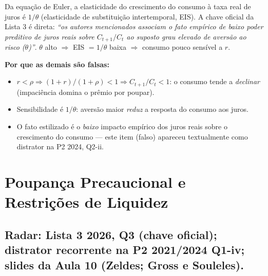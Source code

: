 \documentclass[12pt, a4paper]{article}
\begin{document}
\begin{correctbox}[title={Resposta correta: d)}]
Da equação de Euler, a elasticidade do crescimento do consumo à taxa real de
juros é $1/\theta$ (elasticidade de substituição intertemporal, EIS). A chave
oficial da Lista 3 é direta: \emph{``os autores mencionados associam o fato
empírico de baixo poder preditivo de juros reais sobre $C_{t+1}/C_t$ ao suposto
grau elevado de aversão ao risco ($\theta$)''}. $\theta$ alto $\Rightarrow$
EIS $= 1/\theta$ baixa $\Rightarrow$ consumo pouco sensível a $r$. \checkmark

\textbf{Por que as demais são falsas:}
\begin{itemize}[leftmargin=*]
\item[a)] $r < \rho \Rightarrow (1+r)/(1+\rho) < 1 \Rightarrow C_{t+1}/C_t < 1$:
o consumo tende a \emph{declinar} (impaciência domina o prêmio por poupar).
\item[b)] Sensibilidade é $1/\theta$: aversão maior \emph{reduz} a resposta do
consumo aos juros.
\item[c)] O fato estilizado é o \emph{baixo} impacto empírico dos juros reais
sobre o crescimento do consumo --- este item (falso) apareceu textualmente como
distrator na P2 2024, Q2-ii.
\end{itemize}
\end{correctbox}

\section{Poupança Precaucional e Restrições de Liquidez}

\subsection{Radar: Lista 3 2026, Q3 (chave oficial); distrator recorrente na P2 2021/2024 Q1-iv; slides da Aula 10 (Zeldes; Gross e Souleles).}
\end{document}
